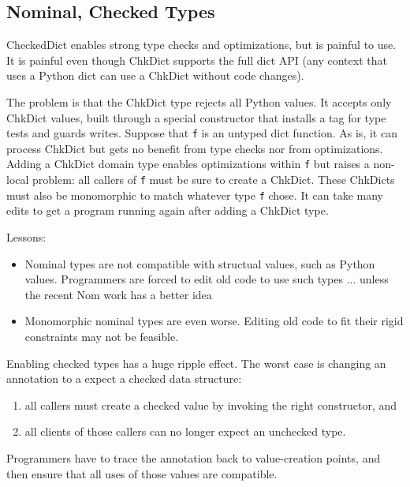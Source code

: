 \documentclass[english,cleveref,submission]{programming}
\newcommand{\code}[1]{\texttt{#1}}
\begin{document}

\subsection{Nominal, Checked Types}
\label{s:concrete-migration}

CheckedDict enables strong type checks and optimizations, but is painful to use.
It is painful even though ChkDict supports the full dict API
(any context that uses a Python dict can use a ChkDict without code changes).

The problem is that the ChkDict type rejects all Python values.
It accepts only ChkDict values, built through a special constructor
that installs a tag for type tests and guards writes.
Suppose that \code{f} is an untyped dict function.
As is, it can process ChkDict but gets no benefit from type checks nor from optimizations.
Adding a ChkDict domain type enables optimizations within \code{f} but raises a non-local
problem: all callers of \code{f} must be sure to create a ChkDict.
These ChkDicts must also be monomorphic to match whatever type \code{f} chose.
It can take many edits to get a program running again after adding a ChkDict type.

Lessons:
\begin{itemize}
  \item
    Nominal types are not compatible with structual values, such as Python values.
    Programmers are forced to edit old code to use such types ... unless the recent Nom work has a better idea~\cite{mt-oopsla-2021}
  \item
    Monomorphic nominal types are even worse.
    Editing old code to fit their rigid constraints may not be feasible.

\end{itemize}

Enabling checked types has a huge ripple effect.
The worst case is changing an annotation to a expect a checked data structure:
\begin{enumerate}
  \item all callers must create a checked value by invoking the right constructor, and
  \item all clients of those callers can no longer expect an unchecked type.
\end{enumerate}
Programmers have to trace the annotation back to value-creation points, and then
ensure that all uses of those values are compatible.
\end{document}
